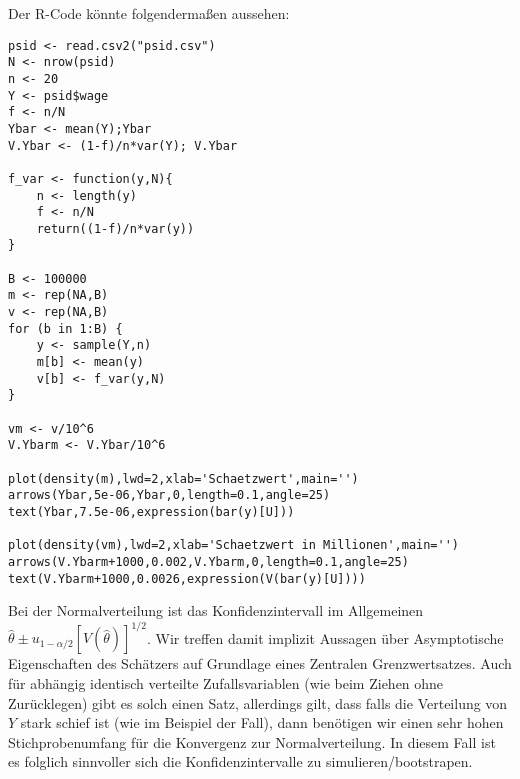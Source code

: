 \documentclass{article}
\begin{document}
\begin{solution}
Der R-Code könnte folgendermaßen aussehen:
\begin{lstlisting}
psid <- read.csv2("psid.csv")
N <- nrow(psid)
n <- 20
Y <- psid$wage
f <- n/N
Ybar <- mean(Y);Ybar
V.Ybar <- (1-f)/n*var(Y); V.Ybar

f_var <- function(y,N){
	n <- length(y)
	f <- n/N
	return((1-f)/n*var(y))
}

B <- 100000
m <- rep(NA,B)
v <- rep(NA,B)
for (b in 1:B) {
	y <- sample(Y,n)
	m[b] <- mean(y)
	v[b] <- f_var(y,N)
}

vm <- v/10^6 
V.Ybarm <- V.Ybar/10^6

plot(density(m),lwd=2,xlab='Schaetzwert',main='')
arrows(Ybar,5e-06,Ybar,0,length=0.1,angle=25)
text(Ybar,7.5e-06,expression(bar(y)[U]))

plot(density(vm),lwd=2,xlab='Schaetzwert in Millionen',main='')
arrows(V.Ybarm+1000,0.002,V.Ybarm,0,length=0.1,angle=25)
text(V.Ybarm+1000,0.0026,expression(V(bar(y)[U])))
\end{lstlisting}
Bei der Normalverteilung ist das Konfidenzintervall im Allgemeinen $\hat{\theta} \pm u_{1-\alpha/2}[V(\hat{\theta})]^{1/2}$. Wir treffen damit implizit Aussagen über Asymptotische Eigenschaften des Schätzers auf Grundlage eines Zentralen Grenzwertsatzes. Auch für abhängig identisch verteilte Zufallsvariablen (wie beim Ziehen ohne Zurücklegen) gibt es solch einen Satz, allerdings gilt, dass falls die Verteilung von $Y$ stark schief ist (wie im Beispiel der Fall), dann benötigen wir einen sehr hohen Stichprobenumfang für die Konvergenz zur Normalverteilung. In diesem Fall ist es folglich sinnvoller sich die Konfidenzintervalle zu simulieren/bootstrapen.
\end{solution}
\end{document}
